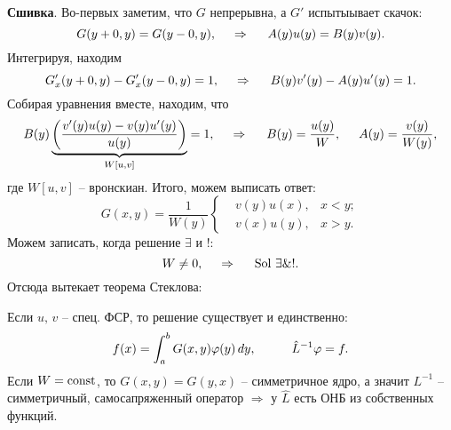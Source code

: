\textbf{Сшивка}. Во-первых заметим, что $G$ непрерывна, а $G'$ испытыывает скачок:
\begin{equation*}
    G(y + 0, y) = G(y-0, y),
    \hspace{0.5cm} \Rightarrow \hspace{0.5cm}
    A(y) u(y) = B(y) v(y).
\end{equation*}
Интегрируя, находим
\begin{equation*}
    G'_x (y + 0, y) - G'_x (y-0, y) = 1,
    \hspace{0.5cm} \Rightarrow \hspace{0.5cm}
    B(y) v'(y) - A(y) u'(y) = 1.
\end{equation*}
Собирая уравнения вместе, находим, что
\begin{equation*}
    B(y) \underbrace{\left(
        \frac{v' (y) u(y) - v(y) u'(y)}{u(y)}
    \right)}_{W[u, v]} = 1,
    \hspace{0.5cm} \Rightarrow \hspace{0.5cm}
    B(y) = \frac{u(y)}{W},\hspace{5 mm} 
    A(y) = \frac{v(y)}{W(y)},
\end{equation*}
где $W[u, v]$ -- вронскиан. Итого, можем выписать ответ:
\begin{equation*}
    G(x, y) = \frac{1}{W(y)} \left\{\begin{aligned}
        &v(y) u(x), &x < y; \\
        &v(x) u(y), &x > y.
    \end{aligned}\right.
\end{equation*}
Можем записать, когда решение $\exists$ и $!$:
\begin{equation*}
    W \neq 0,
    \hspace{0.5cm} \Rightarrow \hspace{0.5cm}
    \text{Sol} \  \exists \& !.
\end{equation*}
Отсюда вытекает теорема Стеклова:

\begin{to_thr}
    Если $u,\, v$ -- спец. ФСР, то решение существует и единственно:
    \begin{equation*}
        f(x) = \int_{a}^{b} G(x, y) \varphi(y) \d y,
        \hspace{10 mm} \hat{L}^{-1} \varphi = f.
    \end{equation*}
    Если $W = \textnormal{const}$, то $G(x, y) =G(y,x)$ -- симметричное ядро, а значит $L^{-1}$ -- симметричный, самосапряженный оператор $\Rightarrow$ у $\hat{L}$ есть ОНБ из собственных функций. 
\end{to_thr}




